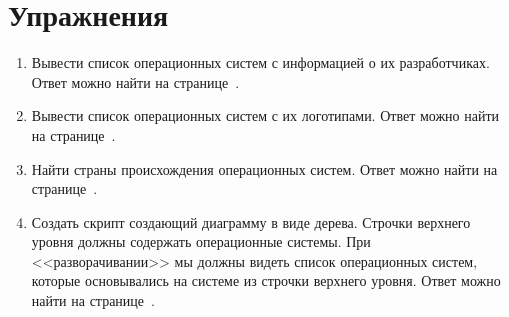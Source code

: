 \section{Упражнения}
\label{tasks:operating_system_tasks}
\begin{enumerate}
	\item Вывести список операционных систем с информацией о их разработчиках. Ответ можно найти на странице~\pageref{answer:os_and_developers}.
	\item Вывести список операционных систем с их логотипами. Ответ можно найти на странице~\pageref{answer:os_and_logos}.
	\item Найти страны происхождения операционных систем. Ответ можно найти на странице~\pageref{answer:os_country}.
	\item Создать скрипт создающий диаграмму в виде дерева. Строчки верхнего уровня должны содержать операционные системы. При <<разворачивании>> мы должны видеть список операционных систем, которые основывались на системе из строчки верхнего уровня. Ответ можно найти на странице~\pageref{answer:os_and_bases}.
\end{enumerate}
